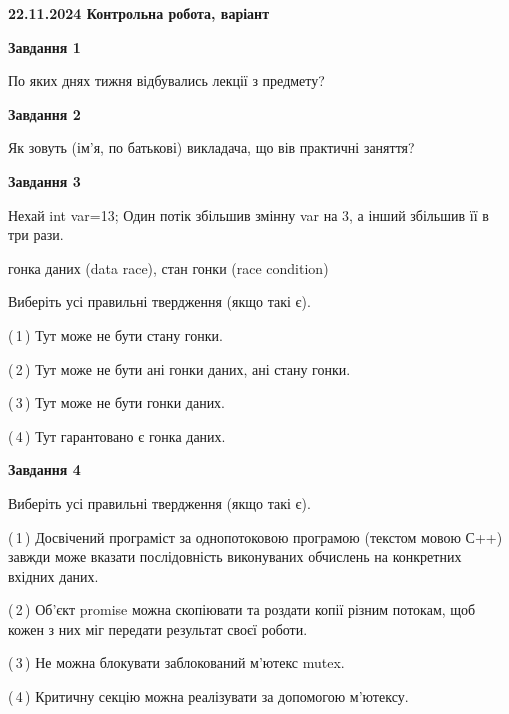 \documentclass[12pt, ukrainian]{article}
\begin{document}
\begin {large}

\textbf{22.11.2024 Контрольна робота, варіант  }\par


{

\begin{center}
\textbf{Завдання 1}
\end{center}

По яких днях тижня відбувались лекції з предмету?


\begin{center}
\textbf{Завдання 2}
\end{center}

Як зовуть (ім'я, по батькові) викладача, що вів практичні заняття?


\begin{center}
\textbf{Завдання 3}
\end{center}

Нехай int var=13; Один потік збільшив змінну var на 3, а інший збільшив її в три рази.

гонка даних (data race), стан гонки (race condition)

Виберіть усі правильні твердження (якщо такі є).\par
\vspace{2mm}
(\,1\,) Тут може не бути стану гонки.%

(\,2\,) Тут може не бути ані гонки даних, ані стану гонки.%

(\,3\,) Тут може не бути гонки даних.%

(\,4\,) Тут гарантовано є гонка даних.%


\begin{center}
\textbf{Завдання 4}
\end{center}

Виберіть усі правильні твердження (якщо такі є).\par
\vspace{2mm}

(\,1\,) Досвічений програміст за однопотоковою програмою (текстом мовою С++) завжди може вказати послідовність виконуваних обчислень на конкретних вхідних даних.%

(\,2\,) Об’єкт promise можна скопіювати та роздати копії різним потокам, щоб кожен з них міг передати результат своєї роботи.%

(\,3\,) Не можна блокувати заблокований м’ютекс mutex.%

(\,4\,) Критичну секцію можна реалізувати за допомогою м’ютексу.%


}
\end{large}
\end{document}
